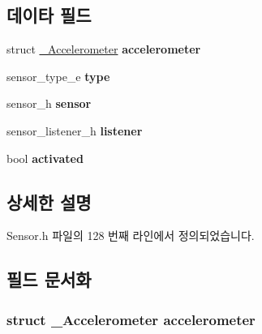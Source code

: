 \subsection*{데이타 필드}
\begin{DoxyCompactItemize}
\item 
\hypertarget{struct__AccelerometerExtend_a98b975c883ef9905587ac41117f74f4c}{struct \hyperlink{struct__Accelerometer}{\-\_\-\-Accelerometer} {\bfseries accelerometer}}\label{struct__AccelerometerExtend_a98b975c883ef9905587ac41117f74f4c}

\item 
\hypertarget{struct__AccelerometerExtend_abffb09766da2fc510a79bb51f82a36e1}{sensor\-\_\-type\-\_\-e {\bfseries type}}\label{struct__AccelerometerExtend_abffb09766da2fc510a79bb51f82a36e1}

\item 
\hypertarget{struct__AccelerometerExtend_a5bae9b7801bc3808411925cde81d3f26}{sensor\-\_\-h {\bfseries sensor}}\label{struct__AccelerometerExtend_a5bae9b7801bc3808411925cde81d3f26}

\item 
\hypertarget{struct__AccelerometerExtend_aa977dfb866b24fd7d9a20a9a01b2fd1f}{sensor\-\_\-listener\-\_\-h {\bfseries listener}}\label{struct__AccelerometerExtend_aa977dfb866b24fd7d9a20a9a01b2fd1f}

\item 
\hypertarget{struct__AccelerometerExtend_a73e9fa0c3543560192f38a8ab6a78c47}{bool {\bfseries activated}}\label{struct__AccelerometerExtend_a73e9fa0c3543560192f38a8ab6a78c47}

\end{DoxyCompactItemize}


\subsection{상세한 설명}


Sensor.\-h 파일의 128 번째 라인에서 정의되었습니다.



\subsection{필드 문서화}
\hypertarget{struct__AccelerometerExtend_a98b975c883ef9905587ac41117f74f4c}{
\subsubsection[{accelerometer}]{\setlength{\rightskip}{0pt plus 5cm}struct {\bf \-\_\-\-Accelerometer} accelerometer}}\label{struct__AccelerometerExtend_a98b975c883ef9905587ac41117f74f4c}


